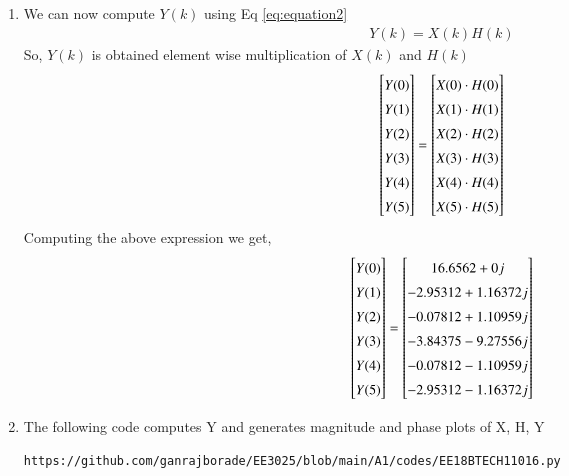 \documentclass[journal,12pt,twocolumn]{IEEEtran}
\renewcommand\thesection{\arabic{section}}
\begin{document}
\begin{enumerate}[label=\thesection.\arabic*.,ref=\thesection.\theenumi]
\item We can now compute $Y(k)$ using 	Eq \eqref{eq:equation2}
\begin{align}
Y(k) = X(k)H(k)
\label{eq:equation2}
\end{align}
So, $Y(k)$ is obtained element wise multiplication of $X(k)$ and $H(k)$
\begin{equation}
\renewcommand{\arraystretch}{1.45}
\setlength\arraycolsep{0.01pt}
\begin{bmatrix} 
Y(0) \\ Y(1) \\ Y(2) \\ Y(3) \\ Y(4) \\ Y(5) 
\end{bmatrix}
=
\begin{bmatrix}
X(0)\cdot H(0) \\ X(1)\cdot H(1) \\ X(2)\cdot H(2) \\ X(3)\cdot H(3) \\ X(4)\cdot H(4) \\ X(5)\cdot H(5)
\end{bmatrix}
\end{equation}
Computing the above expression we get,
\begin{equation}
\renewcommand{\arraystretch}{1.45}
\setlength\arraycolsep{0.01pt}
\begin{bmatrix} 
Y(0) \\ Y(1) \\ Y(2) \\ Y(3) \\ Y(4) \\ Y(5) 
\end{bmatrix}
=
\begin{bmatrix}
16.6562+0j \\ -2.95312+1.16372j \\ -0.07812+1.10959j \\ -3.84375-9.27556j \\ -0.07812-1.10959j \\ -2.95312-1.16372j 
\end{bmatrix}
\end{equation}

\item The following code computes Y and generates magnitude and phase plots of X, H, Y
\begin{lstlisting}
https://github.com/ganrajborade/EE3025/blob/main/A1/codes/EE18BTECH11016.py
\end{lstlisting}


\end{enumerate}
\end{document}
